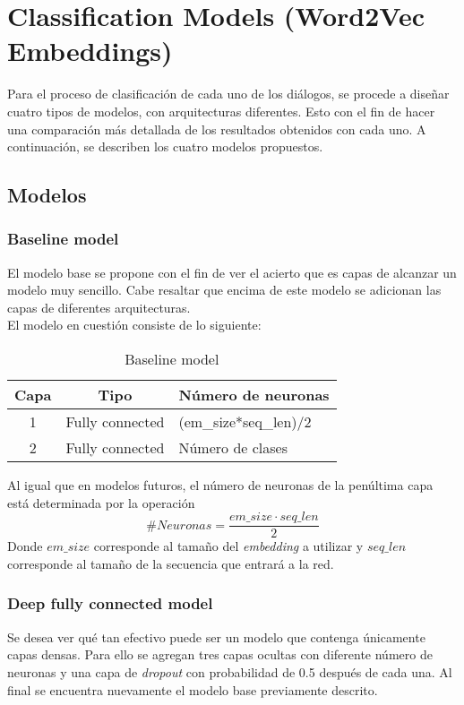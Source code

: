 \section{Classification Models (Word2Vec Embeddings)}
Para el proceso de clasificación de cada uno de los diálogos, se procede a diseñar cuatro tipos de modelos, con arquitecturas diferentes. Esto con el fin de hacer una comparación más detallada de los resultados obtenidos con cada uno. A continuación, se describen los cuatro modelos propuestos.

\subsection{Modelos}
\subsubsection{Baseline model}
El modelo base se propone con el fin de ver el acierto que es capas de alcanzar un modelo muy sencillo. Cabe resaltar que encima de este modelo se adicionan las capas de diferentes arquitecturas.\\

El modelo en cuestión consiste de lo siguiente:

\begin{table}[H]
\centering
\caption{Baseline model}
\label{tab:baseline_1}
\begin{tabular}{|c|l|l|}
\hline
\textbf{Capa} & \multicolumn{1}{c|}{\textbf{Tipo}} & \multicolumn{1}{c|}{\textbf{Número de neuronas}} \\ \hline
1             & Fully connected                    & (em\_size*seq\_len)/2                            \\ \hline
2             & Fully connected                    & Número de clases                                 \\ \hline
\end{tabular}
\end{table}

Al igual que en modelos futuros, el número de neuronas de la penúltima capa está determinada por la operación
\begin{equation}
    \# Neuronas = \frac{em\_size \cdot seq\_len}{2}
\end{equation}
Donde $em\_size$ corresponde al tamaño del \textit{embedding} a utilizar y $seq\_len$ corresponde al tamaño de la secuencia que entrará a la red.

\subsubsection{Deep fully connected model}
Se desea ver qué tan efectivo puede ser un modelo que contenga únicamente capas densas. Para ello se agregan tres capas ocultas con diferente número de neuronas y una capa de \textit{dropout} con probabilidad de 0.5 después de cada una. Al final se encuentra nuevamente el modelo base previamente descrito.

